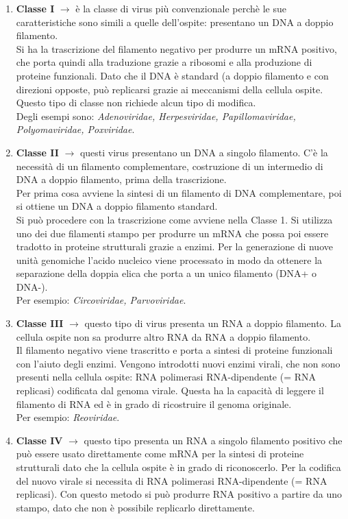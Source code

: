 \begin{enumerate}
    \item \textbf{Classe I} $\xrightarrow{}$ \`e la classe di virus pi\`u convenzionale perch\`e le sue caratteristiche sono simili a quelle dell'ospite: presentano un DNA a doppio filamento. 
    \\Si ha la trascrizione del filamento negativo per produrre un mRNA positivo, che porta quindi alla traduzione grazie a ribosomi e alla produzione di proteine funzionali. Dato che il DNA \`e standard (a doppio filamento e con direzioni opposte, pu\`o replicarsi grazie ai meccanismi della cellula ospite. Questo tipo di classe non richiede alcun tipo di modifica.
    \\Degli esempi sono: \textit{Adenoviridae, Herpesviridae, Papillomaviridae, Polyomaviridae, Poxviridae}.
    \item \textbf{Classe II} $\xrightarrow{}$ questi virus presentano un DNA a singolo filamento. C'\`e la necessit\`a di un filamento complementare, costruzione di un intermedio di DNA a doppio filamento, prima della trascrizione. \\Per prima cosa avviene la sintesi di un filamento di DNA complementare, poi si ottiene un DNA a doppio filamento standard. 
    \\Si pu\`o procedere con la trascrizione come avviene nella Classe 1. Si utilizza uno dei due filamenti stampo per produrre un mRNA che possa poi essere tradotto in proteine strutturali grazie a enzimi. Per la generazione di nuove unit\`a genomiche l'acido nucleico viene processato in modo da ottenere la separazione della doppia elica che porta a un unico filamento (DNA+ o DNA-).
    \\Per esempio: \textit{Circoviridae, Parvoviridae}.
    \item \textbf{Classe III} $\xrightarrow{}$ questo tipo di virus presenta un RNA a doppio filamento. La cellula ospite non sa produrre altro RNA da RNA a doppio filamento. 
    \\Il filamento negativo viene trascritto e porta a sintesi di proteine funzionali con l'aiuto degli enzimi. Vengono introdotti nuovi enzimi virali, che non sono presenti nella cellula ospite: RNA polimerasi RNA-dipendente (= RNA replicasi) codificata dal genoma virale. Questa ha la capacit\`a di leggere il filamento di RNA ed \`e in grado di ricostruire il genoma originale.
    \\Per esempio: \textit{Reoviridae}.
    \item \textbf{Classe IV} $\xrightarrow{}$ questo tipo presenta un RNA a singolo filamento positivo che pu\`o essere usato direttamente come mRNA per la sintesi di proteine strutturali dato che la cellula ospite \`e in grado di riconoscerlo. Per la codifica del nuovo virale si necessita di RNA polimerasi RNA-dipendente (= RNA replicasi). Con questo metodo si pu\`o produrre RNA positivo a partire da uno stampo, dato che non \`e possibile replicarlo direttamente. 

\end{enumerate}
